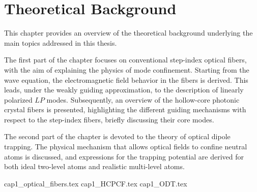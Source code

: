 \documentclass[../../thesis_main.tex]{subfiles}
\begin{document}
    \ifSubfilesClassLoaded{\tableofcontents}{}

    \chapter{Theoretical Background}

    This chapter provides an overview of the theoretical background underlying the main topics addressed in this thesis.

    The first part of the chapter focuses on conventional step-index optical fibers, with the aim of explaining the physics of mode confinement. Starting from the wave equation, the electromagnetic field behavior in the fibers is derived. This leads, under the weakly guiding approximation, to the description of linearly polarized $LP$ modes. Subsequently, an overview of the hollow-core photonic crystal fibers is presented, highlighting the different guiding mechanisms with respect to the step-index fibers, briefly discussing their core modes.

    The second part of the chapter is devoted to the theory of optical dipole trapping. The physical mechanism that allows optical fields to confine neutral atoms is discussed, and expressions for the trapping potential are derived for both ideal two-level atoms and realistic multi-level atoms.
    
    {cap1_optical_fibers.tex}
    \clearpage
    {cap1_HCPCF.tex}
    \clearpage
    {cap1_ODT.tex}

    \ifSubfilesClassLoaded{\printbibliography}{}
\end{document}

